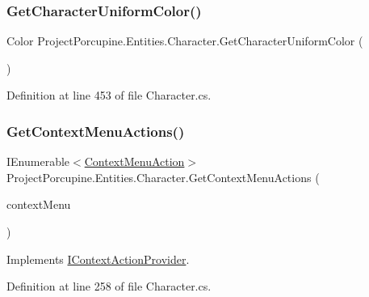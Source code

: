 \subsubsection{\texorpdfstring{Get\+Character\+Uniform\+Color()}{GetCharacterUniformColor()}}
{\footnotesize\ttfamily Color Project\+Porcupine.\+Entities.\+Character.\+Get\+Character\+Uniform\+Color (\begin{DoxyParamCaption}{ }\end{DoxyParamCaption})}



Definition at line 453 of file Character.\+cs.

\mbox{\label{class_project_porcupine_1_1_entities_1_1_character_a57c4c3ef718c8e08d8c9c06df4a3b3f9}} 
\subsubsection{\texorpdfstring{Get\+Context\+Menu\+Actions()}{GetContextMenuActions()}}
{\footnotesize\ttfamily I\+Enumerable$<$\hyperlink{class_context_menu_action}{Context\+Menu\+Action}$>$ Project\+Porcupine.\+Entities.\+Character.\+Get\+Context\+Menu\+Actions (\begin{DoxyParamCaption}\item[{\hyperlink{class_context_menu}{Context\+Menu}}]{context\+Menu }\end{DoxyParamCaption})}



Implements \hyperlink{interface_i_context_action_provider_acb23b31fd7720af55c607a3c12634d1e}{I\+Context\+Action\+Provider}.



Definition at line 258 of file Character.\+cs.

\mbox{\label{class_project_porcupine_1_1_entities_1_1_character_aad98e60530da392f0d4ee0efd0d8cb7c}} 
